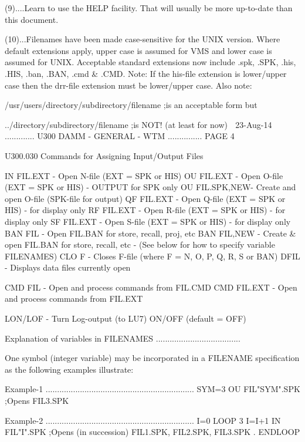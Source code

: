    (9)....Learn  to  use  the  HELP  facility.  That  will  usually  be   more
          up-to-date than this document.
 
   (10)...Filenames  have been made case-sensitive for the UNIX version. Where
          default extensions apply, upper case is assumed for  VMS  and  lower
          case  is  assumed  for  UNIX.  Acceptable  standard  extensions  now
          include .spk, .SPK, .his, .HIS, .ban, .BAN, .cmd &  .CMD.  Note:  If
          the  his-file  extension  is  lower/upper  case  then  the  drr-file
          extension must be lower/upper case. Also note:
 
   /usr/users/directory/subdirectory/filename   ;is an acceptable form but
 
           ../directory/subdirectory/filename   ;is NOT! (at least for now)
    
   23-Aug-14 ............. U300  DAMM - GENERAL - WTM ............... PAGE   4
 
   U300.030  Commands for Assigning Input/Output Files
 
   IN   FIL.EXT    - Open N-file (EXT = SPK or HIS)
   OU   FIL.EXT    - Open O-file (EXT = SPK or HIS) - OUTPUT for SPK only
   OU   FIL.SPK,NEW- Create and open O-file (SPK-file for output)
   QF   FIL.EXT    - Open Q-file (EXT = SPK or HIS) - for display only
   RF   FIL.EXT    - Open R-file (EXT = SPK or HIS) - for display only
   SF   FIL.EXT    - Open S-file (EXT = SPK or HIS) - for display only
   BAN  FIL        - Open FIL.BAN for store, recall, proj, etc
   BAN  FIL,NEW    - Create & open FIL.BAN for store, recall, etc
                   - (See below for how to specify variable FILENAMES)
   CLO  F          - Closes F-file (where F = N, O, P, Q, R, S or BAN)
   DFIL            - Displays data files currently open
 
   CMD  FIL        - Open and process commands from FIL.CMD
   CMD  FIL.EXT    - Open and process commands from FIL.EXT
 
   LON/LOF         - Turn Log-output (to LU7) ON/OFF (default = OFF)
 
   Explanation of variables in FILENAMES .....................................
 
   One   symbol   (integer   variable)  may  be  incorporated  in  a  FILENAME
   specification as the following examples illustrate:
 
   Example-1 .................................................................
   SYM=3
   OU FIL"SYM".SPK  ;Opens FIL3.SPK
 
   Example-2 .................................................................
   I=0
   LOOP 3
   I=I+1
   IN FIL"I".SPK    ;Opens (in succession) FIL1.SPK, FIL2.SPK, FIL3.SPK
   .
   ENDLOOP
 
